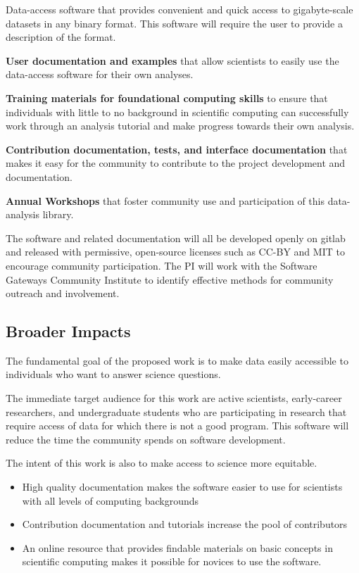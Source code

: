 Data-access software that provides convenient and quick access to gigabyte-scale datasets in any binary format.  This software will require the user to provide a description of the format.

\textbf{User documentation and examples} that allow scientists to easily use the data-access software for their own analyses.

\textbf{Training materials for foundational computing skills} to ensure that individuals with little to no background in scientific computing can successfully work through an analysis tutorial and make progress towards their own analysis.

\textbf{Contribution documentation, tests, and interface documentation} that makes it easy for the community to contribute to the project development and documentation.

\textbf{Annual Workshops} that foster community use and participation of this data-analysis library.

The software and related documentation will all be developed openly on gitlab and released with permissive, open-source licenses such as CC-BY and MIT to encourage community participation.  The PI will work with the Software Gateways Community Institute to identify effective methods for community outreach and involvement.  

\subsection{Broader Impacts}

The fundamental goal of the proposed work is to make data easily accessible to individuals who want to answer science questions.


The immediate target audience for this work are active scientists, early-career researchers, and undergraduate students who are participating in research that require access of data for which there is not a good program.  This software will reduce the time the community spends on software development.  

The intent of this work is also to make access to science more equitable.  
\begin{itemize}
    \item High quality documentation makes the software easier to use for scientists with all levels of computing backgrounds
    \item Contribution documentation and tutorials increase the pool of contributors
    \item An online resource that provides findable materials on basic concepts in scientific computing makes it possible for novices to use the software.
\end{itemize}

